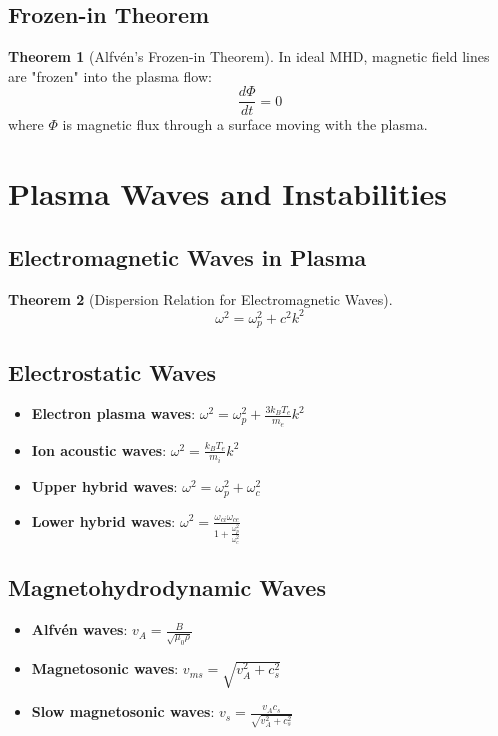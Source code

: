 \documentclass[11pt]{article}
\theoremstyle{definition}
\newtheorem{theorem}{Theorem}[section]
\begin{document}
\subsection{Frozen-in Theorem}
\begin{theorem}[Alfvén's Frozen-in Theorem]
In ideal MHD, magnetic field lines are "frozen" into the plasma flow:
$$\frac{d\Phi}{dt} = 0$$
where $\Phi$ is magnetic flux through a surface moving with the plasma.
\end{theorem}

\section{Plasma Waves and Instabilities}

\subsection{Electromagnetic Waves in Plasma}
\begin{theorem}[Dispersion Relation for Electromagnetic Waves]
$$\omega^2 = \omega_p^2 + c^2 k^2$$
\end{theorem}

\subsection{Electrostatic Waves}
\begin{itemize}
    \item \textbf{Electron plasma waves}: $\omega^2 = \omega_p^2 + \frac{3k_B T_e}{m_e}k^2$
    \item \textbf{Ion acoustic waves}: $\omega^2 = \frac{k_B T_e}{m_i}k^2$
    \item \textbf{Upper hybrid waves}: $\omega^2 = \omega_p^2 + \omega_c^2$
    \item \textbf{Lower hybrid waves}: $\omega^2 = \frac{\omega_{ci} \omega_{ce}}{1 + \frac{\omega_p^2}{\omega_c^2}}$
\end{itemize}

\subsection{Magnetohydrodynamic Waves}
\begin{itemize}
    \item \textbf{Alfvén waves}: $v_A = \frac{B}{\sqrt{\mu_0 \rho}}$
    \item \textbf{Magnetosonic waves}: $v_{ms} = \sqrt{v_A^2 + c_s^2}$
    \item \textbf{Slow magnetosonic waves}: $v_s = \frac{v_A c_s}{\sqrt{v_A^2 + c_s^2}}$
\end{itemize}
\end{document}
